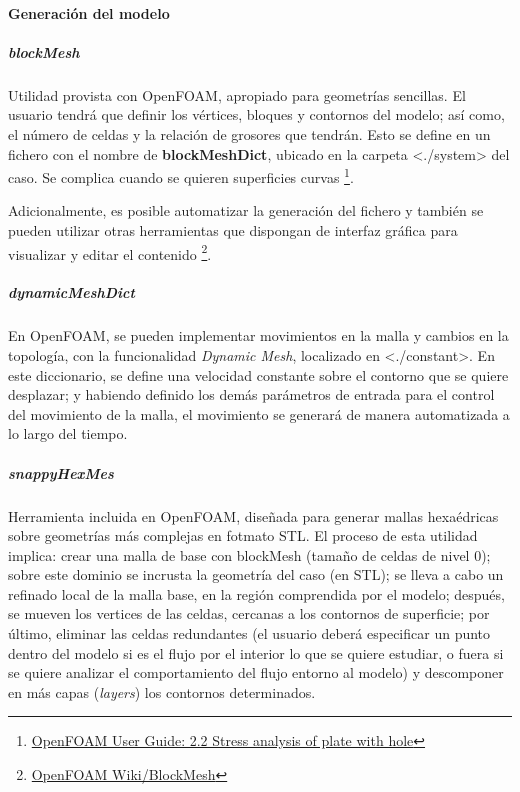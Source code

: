 \paragraph{Generación del modelo}\label{header-n69}

\subparagraph{blockMesh\cite{OpenFOAM}}\label{header-n71}

Utilidad provista con OpenFOAM, apropiado para geometrías sencillas. El
usuario tendrá que definir los vértices, bloques y contornos del modelo;
así como, el número de celdas y la relación de grosores que tendrán.
Esto se define en un fichero con el nombre de \textbf{blockMeshDict},
ubicado en la carpeta \textless{}./system\textgreater{} del caso. Se
complica cuando se quieren superficies curvas
\footnote{\href{https://cfd.direct/openfoam/user-guide/plateHole/#x6-400002.2.1}{OpenFOAM
User Guide: 2.2 Stress analysis of plate with hole}}.

Adicionalmente, es posible automatizar la generación del fichero y
también se pueden utilizar otras herramientas que dispongan de interfaz
gráfica para visualizar y editar el contenido
\footnote{
\href{https://openfoamwiki.net/index.php/BlockMesh}{OpenFOAM
Wiki/BlockMesh}}.

\subparagraph{dynamicMeshDict\cite{Nozaki}}\label{header-n76}

En OpenFOAM, se pueden implementar movimientos en la malla y cambios en
la topología, con la funcionalidad \emph{Dynamic Mesh}, localizado en
\textless{}./constant\textgreater{}. En este diccionario, se define una
velocidad constante sobre el contorno que se quiere desplazar; y
habiendo definido los demás parámetros de entrada para el control del
movimiento de la malla, el movimiento se generará de manera automatizada
a lo largo del tiempo.

\subparagraph{snappyHexMes\cite{snappyHexMesh}}\label{header-n79}

Herramienta incluida en OpenFOAM, diseñada para generar mallas
hexaédricas sobre geometrías más complejas en fotmato STL. El proceso de
esta utilidad implica: crear una malla de base con blockMesh (tamaño de
celdas de nivel 0); sobre este dominio se incrusta la geometría del caso
(en STL); se lleva a cabo un refinado local de la malla base, en la
región comprendida por el modelo; después, se mueven los vertices de las
celdas, cercanas a los contornos de superficie; por último, eliminar las
celdas redundantes (el usuario deberá especificar un punto dentro del
modelo si es el flujo por el interior lo que se quiere estudiar, o fuera
si se quiere analizar el comportamiento del flujo entorno al modelo) y
descomponer en más capas (\emph{layers}) los contornos determinados.

